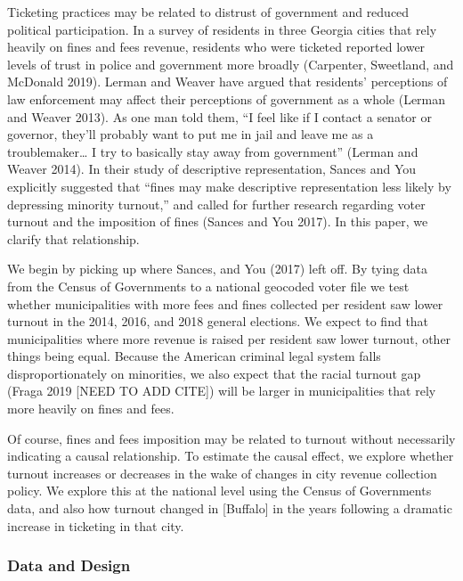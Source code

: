 \documentclass[
  12pt,
]{article}
\begin{document}
Ticketing practices may be related to distrust of government and reduced political participation. In a survey of residents in three Georgia cities that rely heavily on fines and fees revenue, residents who were ticketed reported lower levels of trust in police and government more broadly (Carpenter, Sweetland, and McDonald 2019). Lerman and Weaver have argued that residents' perceptions of law enforcement may affect their perceptions of government as a whole (Lerman and Weaver 2013). As one man told them, ``I feel like if I contact a senator or governor, they'll probably want to put me in jail and leave me as a troublemaker\ldots{} I try to basically stay away from government'' (Lerman and Weaver 2014). In their study of descriptive representation, Sances and You explicitly suggested that ``fines may make descriptive representation less likely by depressing minority turnout,'' and called for further research regarding voter turnout and the imposition of fines (Sances and You 2017). In this paper, we clarify that relationship.

We begin by picking up where Sances, and You (2017) left off. By tying data from the Census of Governments to a national geocoded voter file we test whether municipalities with more fees and fines collected per resident saw lower turnout in the 2014, 2016, and 2018 general elections. We expect to find that municipalities where more revenue is raised per resident saw lower turnout, other things being equal. Because the American criminal legal system falls disproportionately on minorities, we also expect that the racial turnout gap (Fraga 2019 {[}NEED TO ADD CITE{]}) will be larger in municipalities that rely more heavily on fines and fees.

Of course, fines and fees imposition may be related to turnout without necessarily indicating a causal relationship. To estimate the causal effect, we explore whether turnout increases or decreases in the wake of changes in city revenue collection policy. We explore this at the national level using the Census of Governments data, and also how turnout changed in {[}Buffalo{]} in the years following a dramatic increase in ticketing in that city.

\hypertarget{data-and-design}{%
\subsubsection*{Data and Design}\label{data-and-design}}
\end{document}
